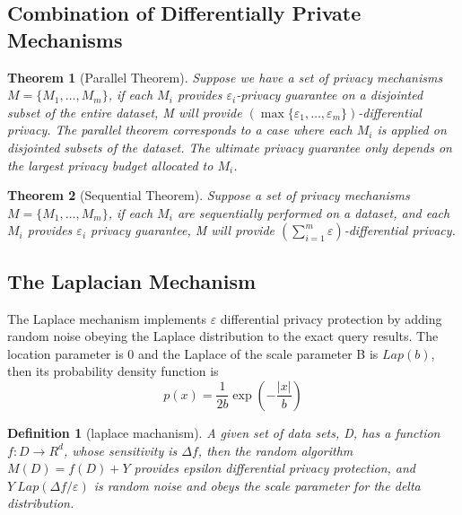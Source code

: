 \documentclass[10pt,conference]{IEEEtran}
\newtheorem{theorem}{Theorem}
\newtheorem{definition}{Definition}
\begin{document}
\subsection{Combination of Differentially Private Mechanisms}


\begin{theorem}[Parallel Theorem\cite{Mcsherry2010Privacy}]
Suppose we have a set of privacy mechanisms $M = \{ {M_1}, \ldots ,{M_m}\} $, if each ${M_i}$ provides ${\varepsilon _i}$-privacy guarantee on a disjointed subset of the entire dataset, M will provide $(\max \{ {\varepsilon _1}, \ldots ,{\varepsilon _m}\}) $-differential privacy. The parallel theorem
corresponds to a case where each ${M_i}$ is applied on disjointed subsets of the dataset. The ultimate privacy guarantee only depends on the largest privacy budget allocated to ${M_i}$.
\end{theorem} 


\begin{theorem}[Sequential Theorem\cite{Mcsherry2010Privacy}]
Suppose a set of privacy mechanisms $M = \{ {M_1}, \ldots ,{M_m}\} $, if each ${M_i}$ are sequentially performed on a dataset, and each ${M_i}$ provides ${\varepsilon _i}$ privacy guarantee, M will provide $(\sum\nolimits_{i = 1}^m \varepsilon  )$-differential privacy.
\end{theorem} 


\subsection{The Laplacian Mechanism}

The Laplace mechanism implements $\varepsilon$ differential privacy protection by adding random noise obeying the Laplace distribution to the exact query results. The location parameter is 0 and the Laplace of the scale parameter B is $Lap(b)$, then its probability density function is
\begin{equation}
p(x) = \frac{1}{{2b}}\exp ( - \frac{{|x|}}{b})
\end{equation}

\begin{definition} [laplace machanism\cite{Dwork2006Calibrating}]
A given set of data sets, D, has a function $f:D\rightarrow R^{d}$, whose sensitivity is  $\Delta f$, then the random algorithm $M(D)=f(D)+Y$ provides epsilon differential privacy protection, and $Y~\mathit{Lap}(\Delta f/\varepsilon )$ is random noise and obeys the scale parameter for the delta distribution.
\end{definition}
\end{document}
